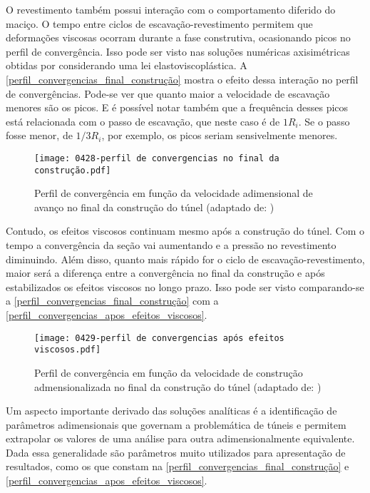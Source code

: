 O revestimento também possui interação com o comportamento diferido do maciço. O tempo entre ciclos de escavação-revestimento permitem que deformações viscosas ocorram durante a fase construtiva, ocasionando picos no perfil de convergência. Isso pode ser visto nas soluções numéricas axisimétricas obtidas por  considerando uma lei elastoviscoplástica. A \autoref{perfil_convergencias_final_construção} mostra o efeito dessa interação no perfil de convergências. Pode-se ver que quanto maior a velocidade de escavação menores são os picos. E é possível notar também que a frequência desses picos está relacionada com o passo de escavação, que neste caso é de $1R_i$. Se o passo fosse menor, de $1/3R_i$, por exemplo, os picos seriam sensivelmente menores.

\begin{figure}[H]
	\begin{center}
		\texttt{[image: 0428-perfil de convergencias no final da construção.pdf]}
	\end{center}
	\caption{\label{perfil_convergencias_final_construção}Perfil de convergência em função da velocidade adimensional de avanço no final da construção do túnel (adaptado de: )}
\end{figure}

Contudo, os efeitos viscosos continuam mesmo após a construção do túnel. Com o tempo a convergência da seção vai aumentando e a pressão no revestimento diminuindo. Além disso, quanto mais rápido for o ciclo de escavação-revestimento, maior será a diferença entre a convergência no final da construção e após estabilizados os efeitos viscosos no longo prazo. Isso pode ser visto comparando-se a \autoref{perfil_convergencias_final_construção} com a \autoref{perfil_convergencias_apos_efeitos_viscosos}.

\begin{figure}[H]
	\begin{center}
		\texttt{[image: 0429-perfil de convergencias após efeitos viscosos.pdf]}
	\end{center}
	\caption{\label{perfil_convergencias_apos_efeitos_viscosos}Perfil de convergência em função da velocidade de construção admensionalizada no final da construção do túnel (adaptado de: )}
\end{figure}

Um aspecto importante derivado das soluções analíticas é a identificação de parâmetros adimensionais que governam a problemática de túneis e permitem extrapolar os valores de uma análise para outra adimensionalmente equivalente. Dada essa generalidade são parâmetros muito utilizados para apresentação de resultados, como os que constam na \autoref{perfil_convergencias_final_construção} e \autoref{perfil_convergencias_apos_efeitos_viscosos}.

